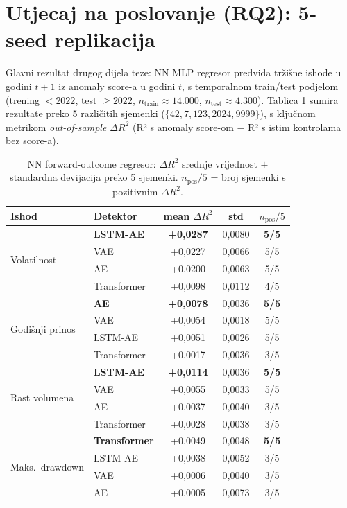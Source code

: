 \documentclass[diplomskirad,authoryear]{fer}
\begin{document}
\section{Utjecaj na poslovanje (RQ2): 5-seed replikacija}

Glavni rezultat drugog dijela teze: NN MLP regresor predviđa tržišne ishode u godini $t+1$ iz anomaly score-a u godini $t$, s temporalnom train/test podjelom (trening $<2022$, test $\geq 2022$, $n_{\text{train}}\approx 14.000$, $n_{\text{test}}\approx 4.300$). Tablica \ref{tab:impact_5seed} sumira rezultate preko 5 različitih sjemenki ($\{42, 7, 123, 2024, 9999\}$), s ključnom metrikom \emph{out-of-sample $\Delta R^2$} (R² s anomaly score-om $-$ R² s istim kontrolama bez score-a).

\begin{table}[h]
\centering
\caption{NN forward-outcome regresor: $\Delta R^2$ srednje vrijednost $\pm$ standardna devijacija preko 5 sjemenki. $n_{\text{pos}}/5$ = broj sjemenki s pozitivnim $\Delta R^2$.}
\label{tab:impact_5seed}
\begin{tabular}{llccc}
\toprule
Ishod & Detektor & \textbf{mean $\Delta R^2$} & std & $n_{\text{pos}}/5$ \\
\midrule
\multirow{4}{*}{Volatilnost}
 & \textbf{LSTM-AE} & \textbf{+0,0287} & 0,0080 & \textbf{5/5} \\
 & VAE & +0,0227 & 0,0066 & 5/5 \\
 & AE & +0,0200 & 0,0063 & 5/5 \\
 & Transformer & +0,0098 & 0,0112 & 4/5 \\
\midrule
\multirow{4}{*}{Godišnji prinos}
 & \textbf{AE} & \textbf{+0,0078} & 0,0036 & \textbf{5/5} \\
 & VAE & +0,0054 & 0,0018 & 5/5 \\
 & LSTM-AE & +0,0051 & 0,0026 & 5/5 \\
 & Transformer & +0,0017 & 0,0036 & 3/5 \\
\midrule
\multirow{4}{*}{Rast volumena}
 & \textbf{LSTM-AE} & \textbf{+0,0114} & 0,0036 & \textbf{5/5} \\
 & VAE & +0,0055 & 0,0033 & 5/5 \\
 & AE & +0,0037 & 0,0040 & 3/5 \\
 & Transformer & +0,0028 & 0,0038 & 3/5 \\
\midrule
\multirow{4}{*}{Maks.\ drawdown}
 & \textbf{Transformer} & +0,0049 & 0,0048 & \textbf{5/5} \\
 & LSTM-AE & +0,0038 & 0,0052 & 3/5 \\
 & VAE & +0,0006 & 0,0040 & 3/5 \\
 & AE & +0,0005 & 0,0073 & 3/5 \\
\bottomrule
\end{tabular}
\end{table}
\end{document}
